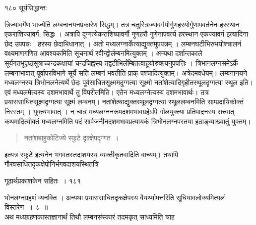 \documentclass[11pt, openany]{book}
\begin{document}
 \noindent १८० \hspace{4cm} सूर्यसिद्धान्तः 
\vspace{1cm}

\begin{sloppypar}
\noindent त्रिज्यावर्गेण भाज्येति लम्बनानयनप्रकारेण सिद्धम्। तत्र चतुस्त्रिज्यावर्गयोर्गुणहरयोर्गुणापवर्तनेन हरस्थान एकराशिज्यावर्ग: सिद्धः । अत्रापि दूग्गत्येकराशिष्यावर्गौ गुणहरौ गुणेनापवर्त्य हरस्थान एकज्यावर्ग इत्यादिना छेद उपपन्नः। हरस्य छेदाभिधानात् । अतो मध्यलग्नार्केत्याद्युक्तमुपपन्नम् । लम्बनघटीभिरुभयोश्चालनं वक्ष्यमाणगणित आवश्यकमिति सूचनार्थं रवीन्द्वोर्लम्बनमित्युक्तम् । अन्यथा दर्शान्तकाले सूर्यगतभूपृष्ठसूत्राच्चन्द्रकक्षायां चन्द्रचिह्नस्य तद्वटीभिर्लंम्बितत्वाहूयोरुक्त्यनुपपत्तिः । त्रिभानलग्नसमेऽर्के लम्बनाभावात् पूर्वापरविभागे सूर्ये सति लम्बनं भवतीति प्राक् पश्चादित्युक्तम्। अत्रेदमवधेयम्। लम्बनानयने मध्यलग्नस्य त्रिभोनलनेत्यर्थे छेदः पूर्वसाधितसूक्ष्ममदुग्गत्या सूक्ष्मो नतांशेत्यादिगृहीतस्थूलदृग्गत्या स्थूल इति। एवं मध्यलमेत्यस्य दशमभावार्थे तु विपरीतमिति। एतेन मध्यलग्नेत्यस्य दशमभावार्थः। तत्र प्रयाससाधितसूक्ष्मदृग्गत्या सूक्ष्मं लम्बनम्। नतांशेत्थाद्युक्तस्थूलदृग्गत्या स्थूललम्बनमिति साम्प्रदायिकोक्तं निरस्तम् । युक्त्यभावात् । न चात्र मध्यलग्ननरूपदशमभावग्रहेऽपि गोलयुक्त्या प्रतिपादनस्य सत्त्वात् कथमादित्योक्तं मध्यलग्नमिति पदं सार्वजनीनदशमभावप्रत्यायकं त्रिभोनलग्नपरतया हठाङ्व्याख्यातुं युक्तम्।
\end{sloppypar}


\begin{quote}
{\qt नतांशबाहुकोटिज्ये स्फुटे दृक्क्षेपदृग्गत~।}
\end{quote}

\begin{sloppypar}
\noindent इत्यत्र स्फुटे इत्यनेन भगवतस्तदाशयस्य व्यक्तीकृतवादिति वाच्यम्। तथापि गौरवसाधितदृकक्षेपोनिर्भगवदाशयस्थितत्रि\textendash
\end{sloppypar}

\newpage


\hspace{3cm} गूढार्थप्रकाशकेन सहितः~। \hfill १८१
\vspace{1cm}

\begin{sloppypar}
\noindent भोनलग्नग्रहणं व्यनक्ति । अन्यथा प्रयाससाधितदृकक्षेपस्य वैयर्थ्यापत्तरिति सूधियावलोक्यमित्यलं विस्तरेण~॥~८~॥\\
\noindent अथ मध्यग्रहणकास्तज्ञानार्थं तिथौ लम्बनसंस्कारं तदमकृत् साध्यमिति चाह\textendash
\end{sloppypar}
\end{document}
